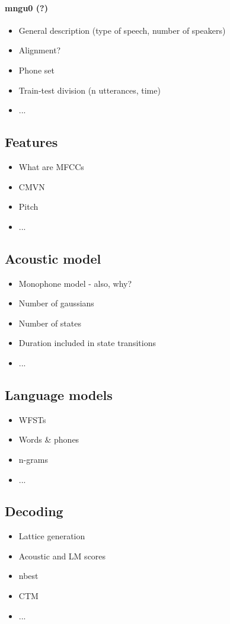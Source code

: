 \paragraph{mngu0 (?)}
\begin{itemize}
\item General description (type of speech, number of speakers)
\item Alignment?
\item Phone set
\item Train-test division (n utterances, time)
\item ...
\end{itemize}

\subsection{Features}
\begin{itemize}
\item What are MFCCs
\item CMVN
\item Pitch
\item ...
\end{itemize}

\subsection{Acoustic model}
\begin{itemize}
\item Monophone model - also, why?
\item Number of gaussians
\item Number of states
\item Duration included in state transitions 
\item ...
\end{itemize}
    
\subsection{Language models}
\begin{itemize}
\item WFSTs
\item Words \& phones 
\item n-grams
\item ...
\end{itemize}

\subsection{Decoding}
\begin{itemize}
\item Lattice generation
\item Acoustic and LM scores 
\item nbest
\item CTM
\item ...
\end{itemize}

